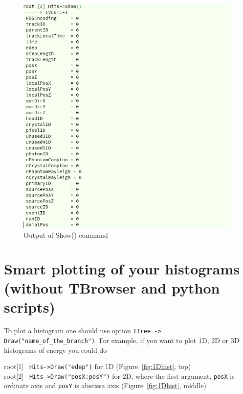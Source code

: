 \documentclass[12pt]{article}
\begin{document}
\begin{figure}[h]
\centering
\includegraphics[scale=0.5]{figs/Show.png}
\caption{Output of Show() command}
\label{fig:Show}
\end{figure}



\section{Smart plotting of your histograms (without TBrowser and python scripts)}
To plot a histogram one should use option \verb|TTree -> Draw("name_of_the_branch")|. For example, if you want to plot 1D, 2D or 3D histograms of energy you could do    

root[1] \verb| Hits->Draw("edep")| for 1D (Figure~\ref{fig:1Dhist}, top) \\

root[2] \verb| Hits->Draw("posX:posY")| for 2D, where the first argument, \verb|posX| is ordinate axis and \verb|posY| is abscissa axis  (Figure~\ref{fig:1Dhist}, middle)\\
\end{document}
